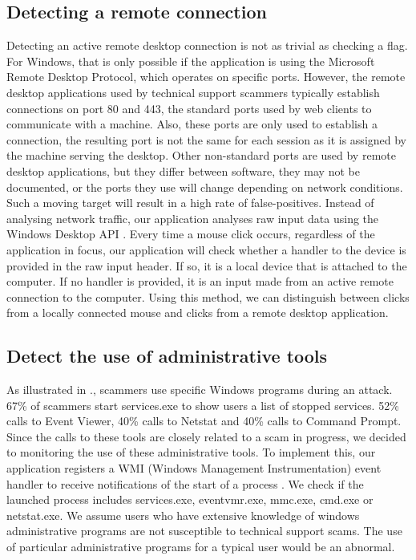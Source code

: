 \documentclass[final]{IEEEtran}
\begin{document}
\subsection{Detecting a remote connection}
Detecting an active remote desktop connection is not as trivial as checking a flag. For Windows, that is only possible if the application is using the Microsoft Remote Desktop Protocol, which operates on specific ports. However, the remote desktop applications used by technical support scammers typically establish connections on port 80 and 443, the standard ports used by web clients to communicate with a machine. Also, these ports are only used to establish a connection, the resulting port is not the same for each session as it is assigned by the machine serving the desktop. Other non-standard ports are used by remote desktop applications, but they differ between software, they may not be documented, or the ports they use will change depending on network conditions. Such a moving target will result in a high rate of false-positives. Instead of analysing network traffic, our application analyses raw input data using the Windows Desktop API \cite {b4}. Every time a mouse click occurs, regardless of the application in focus, our application will check whether a handler to the device is provided in the raw input header. If so, it is a local device that is attached to the computer. If no handler is provided, it is an input made from an active remote connection to the computer. Using this method, we can distinguish between clicks from a locally connected mouse and clicks from a remote desktop application.

\subsection{Detect the use of administrative tools}
As illustrated in \cite[Fig 2]{b2}., scammers use specific Windows programs during an attack. 67\% of scammers start services.exe to show users a list of stopped services. 52\% calls to Event Viewer, 40\% calls to Netstat and 40\% calls to Command Prompt. Since the calls to these tools are closely related to a scam in progress, we decided to monitoring the use of these administrative tools. To implement this, our application registers a WMI (Windows Management Instrumentation) event handler to receive notifications of the start of a process \cite{b9}. We check if the launched process includes services.exe, eventvmr.exe, mmc.exe, cmd.exe or netstat.exe. We assume users who have extensive knowledge of windows administrative programs are not susceptible to technical support scams. The use of particular administrative programs for a typical user would be an abnormal. 
\end{document}
